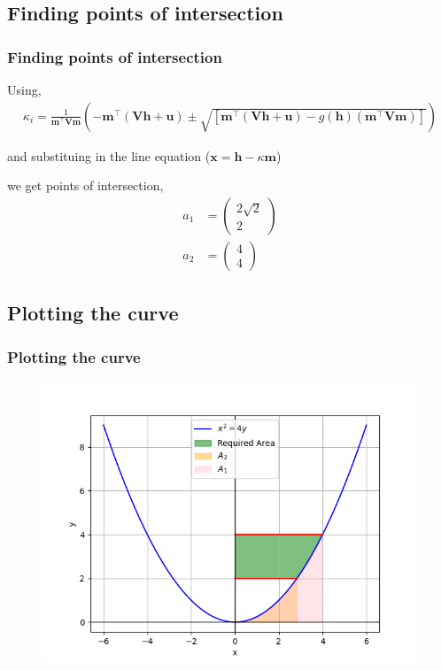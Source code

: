 \documentclass{beamer}
\providecommand{\sbrak}[1]{\ensuremath{{}\left[#1\right]}}
\providecommand{\brak}[1]{\ensuremath{\left(#1\right)}}
\theoremstyle{remark}
\newcommand{\myvec}[1]{\ensuremath{\begin{pmatrix}#1\end{pmatrix}}}
\let\vec\mathbf
\numberwithin{equation}{section}
\begin{document}
\subsection{Finding points of intersection}
\begin{frame}
\frametitle{Finding points of intersection}
Using,
\begin{align}
\kappa_i = \frac{1}{\vec{m}^\top\vec{V}\vec{m}}\brak{-\vec{m}^\top\brak{\vec{Vh}+\vec{u}}\pm\sqrt{\sbrak{\vec{m}^\top\brak{\vec{Vh}+\vec{u}}-g(\vec{h})(\vec{m}^\top\vec{Vm})}}}
\end{align}

and substituing in the line equation ($\vec{x} = \vec{h} - \kappa\vec{m}$)

we get points of intersection,
\begin{align}
a_1 &= \myvec{2\sqrt{2}\\2}\\
a_2 &= \myvec{4\\4}
\end{align}

\end{frame}

\subsection{Plotting the curve}
\begin{frame}
\frametitle{Plotting the curve}
\begin{figure}[h]
    \includegraphics[scale=0.6]{./figs/fig1.png}
\centering
\end{figure}
\end{frame}
\end{document}
